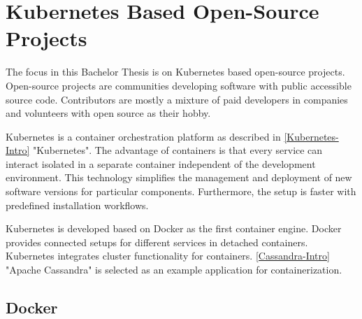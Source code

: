 \section{Kubernetes Based Open-Source Projects}

The focus in this Bachelor Thesis is on Kubernetes based open-source projects. Open-source projects are communities developing software with public accessible source code. Contributors are mostly a mixture of paid developers in companies and volunteers with open source as their hobby.

Kubernetes is a container orchestration platform as described in \ref{Kubernetes-Intro} "Kubernetes".
The advantage of containers is that every service can interact isolated in a separate container independent of the development environment. This technology simplifies the management and deployment of new software versions for particular components.
Furthermore, the setup is faster with predefined installation workflows.

Kubernetes is developed based on Docker as the first container engine. Docker provides connected setups for different services in detached containers. Kubernetes integrates cluster functionality for containers.
\ref{Cassandra-Intro} "Apache Cassandra" is selected as an example application for containerization.

\subsection{Docker}\label{Docker-Intro}

